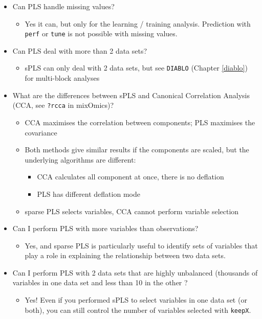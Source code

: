 \documentclass[]{book}
\providecommand{\tightlist}{%
  \setlength{\itemsep}{0pt}\setlength{\parskip}{0pt}}
\theoremstyle{definition}
\theoremstyle{definition}
\theoremstyle{definition}
\theoremstyle{remark}
\begin{document}
\begin{itemize}
\tightlist
\item
  Can PLS handle missing values?

  \begin{itemize}
  \tightlist
  \item
    Yes it can, but only for the learning / training analysis.
    Prediction with \texttt{perf} or \texttt{tune} is not possible with
    missing values.
  \end{itemize}
\item
  Can PLS deal with more than 2 data sets?

  \begin{itemize}
  \tightlist
  \item
    sPLS can only deal with 2 data sets, but see \texttt{DIABLO}
    (Chapter \ref{diablo}) for multi-block analyses
  \end{itemize}
\item
  What are the differences between sPLS and Canonical Correlation
  Analysis (CCA, see \texttt{?rcca} in mixOmics)?

  \begin{itemize}
  \tightlist
  \item
    CCA maximises the correlation between components; PLS maximises the
    covariance
  \item
    Both methods give similar results if the components are scaled, but
    the underlying algorithms are different:

    \begin{itemize}
    \tightlist
    \item
      CCA calculates all component at once, there is no deflation
    \item
      PLS has different deflation mode
    \end{itemize}
  \item
    sparse PLS selects variables, CCA cannot perform variable selection
  \end{itemize}
\item
  Can I perform PLS with more variables than observations?

  \begin{itemize}
  \tightlist
  \item
    Yes, and sparse PLS is particularly useful to identify sets of
    variables that play a role in explaining the relationship between
    two data sets.
  \end{itemize}
\item
  Can I perform PLS with 2 data sets that are highly unbalanced
  (thousands of variables in one data set and less than 10 in the other
  ?

  \begin{itemize}
  \tightlist
  \item
    Yes! Even if you performed sPLS to select variables in one data set
    (or both), you can still control the number of variables selected
    with \texttt{keepX}.
  \end{itemize}
\end{itemize}
\end{document}
